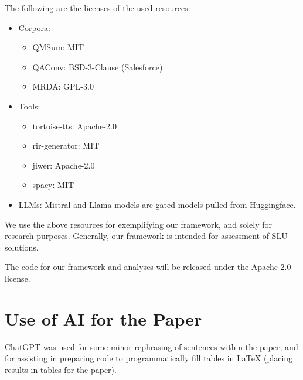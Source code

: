 The following are the licenses of the used resources:
\begin{itemize}[noitemsep, topsep=0pt]
    \item Corpora:
    \begin{itemize}[noitemsep, topsep=0pt]
        \item QMSum: MIT
        \item QAConv: BSD-3-Clause (Salesforce)
        \item MRDA: GPL-3.0
    \end{itemize}
    \item Tools:
    \begin{itemize}[noitemsep, topsep=0pt]
        \item tortoise-tts: Apache-2.0
        \item rir-generator: MIT
        \item jiwer: Apache-2.0
        \item spacy: MIT
    \end{itemize}
    \item LLMs: Mistral and Llama models are gated models pulled from Huggingface.
\end{itemize}

\noindent
We use the above resources for exemplifying our framework, and solely for research purposes. Generally, our framework is intended for assessment of SLU solutions.

The code for our framework and analyses will be released under the Apache-2.0 license.


\section{Use of AI for the Paper}

ChatGPT was used for some minor rephrasing of sentences within the paper, and for assisting in preparing code to programmatically fill tables in LaTeX (placing results in tables for the paper).